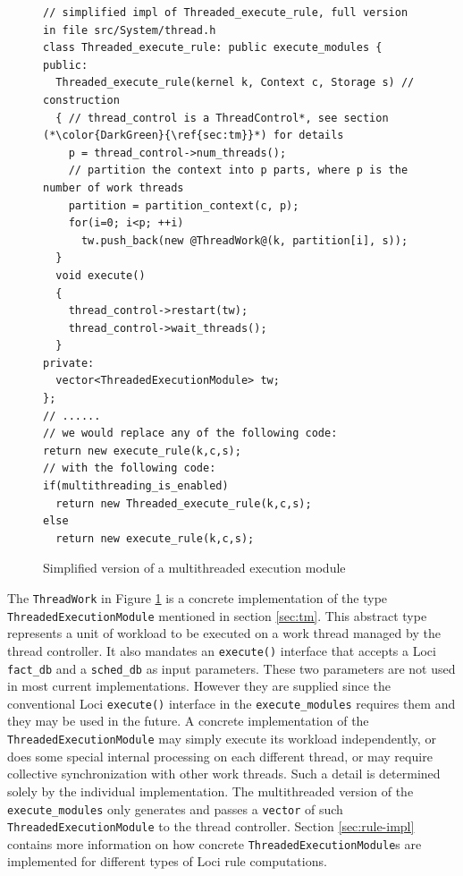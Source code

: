 \documentclass{article}
\begin{document}
\begin{figure}[h]
  \begin{lstlisting}
// simplified impl of Threaded_execute_rule, full version in file src/System/thread.h
class Threaded_execute_rule: public execute_modules {
public:
  Threaded_execute_rule(kernel k, Context c, Storage s) // construction
  { // thread_control is a ThreadControl*, see section (*\color{DarkGreen}{\ref{sec:tm}}*) for details
    p = thread_control->num_threads(); 
    // partition the context into p parts, where p is the number of work threads
    partition = partition_context(c, p);
    for(i=0; i<p; ++i)
      tw.push_back(new @ThreadWork@(k, partition[i], s));    
  }
  void execute()
  {
    thread_control->restart(tw);
    thread_control->wait_threads();
  }
private:
  vector<ThreadedExecutionModule> tw;
};
// ......
// we would replace any of the following code:
return new execute_rule(k,c,s);
// with the following code:
if(multithreading_is_enabled)
  return new Threaded_execute_rule(k,c,s);
else
  return new execute_rule(k,c,s);
  \end{lstlisting}
  \caption{Simplified version of a multithreaded execution module\label{fig:texe}}
\end{figure}

The \lstinline{ThreadWork} in Figure \ref{fig:texe} is a concrete
implementation of the type \lstinline{ThreadedExecutionModule} mentioned
in section \ref{sec:tm}.  This abstract type represents a unit of
workload to be executed on a work thread managed by the thread
controller.  It also mandates an \lstinline{execute()} interface that
accepts a Loci \lstinline{fact_db} and a \lstinline{sched_db} as input
parameters.  These two parameters are not used in most current
implementations.  However they are supplied since the conventional Loci
\lstinline{execute()} interface in the \lstinline{execute_modules}
requires them and they may be used in the future.  A concrete
implementation of the \lstinline{ThreadedExecutionModule} may simply
execute its workload independently, or does some special internal
processing on each different thread, or may require collective
synchronization with other work threads.  Such a detail is determined
solely by the individual implementation.  The multithreaded version of
the \lstinline{execute_modules} only generates and passes a
\lstinline{vector} of such \lstinline{ThreadedExecutionModule} to the
thread controller.  Section \ref{sec:rule-impl} contains more
information on how concrete \lstinline{ThreadedExecutionModule}s are
implemented for different types of Loci rule computations.
\end{document}
